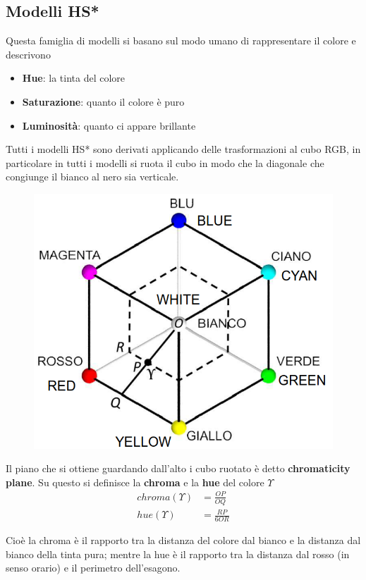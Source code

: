 \subsection{Modelli HS*}
Questa famiglia di modelli si basano sul modo umano di rappresentare il colore e descrivono 
\begin{itemize}
	\item \textbf{Hue}: la tinta del colore
	\item \textbf{Saturazione}: quanto il colore è puro
	\item \textbf{Luminosità}: quanto ci appare brillante
\end{itemize}
Tutti i modelli HS* sono derivati applicando delle trasformazioni al cubo RGB, in particolare in tutti i modelli si ruota il cubo in modo che la diagonale che congiunge il bianco al nero sia verticale.

\begin{figure}
	\hspace{.09\linewidth}
	\includegraphics[width=.9\linewidth]{Picture/Cromaticity_Plane}
\end{figure}
Il piano che si ottiene guardando dall'alto i cubo ruotato è detto \textbf{chromaticity plane}. Su questo si definisce la \textbf{chroma} e la \textbf{hue} del colore $\Upsilon$
\begin{align}
	chroma(\Upsilon) &= \frac{OP}{OQ}\\
	hue(\Upsilon) &= \frac{RP}{6OR}
\end{align}

Cioè la chroma è il rapporto tra la distanza del colore dal bianco e la distanza dal bianco della tinta pura; mentre la hue è il rapporto tra la distanza dal rosso (in senso orario) e il perimetro dell'esagono.
